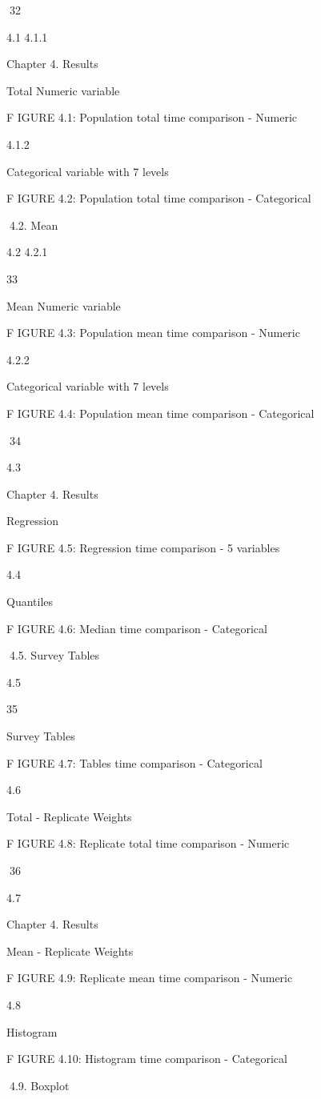 32

4.1
4.1.1

Chapter 4. Results

Total
Numeric variable

F IGURE 4.1: Population total time comparison - Numeric

4.1.2

Categorical variable with 7 levels

F IGURE 4.2: Population total time comparison - Categorical

4.2. Mean

4.2
4.2.1

33

Mean
Numeric variable

F IGURE 4.3: Population mean time comparison - Numeric

4.2.2

Categorical variable with 7 levels

F IGURE 4.4: Population mean time comparison - Categorical

34

4.3

Chapter 4. Results

Regression

F IGURE 4.5: Regression time comparison - 5 variables

4.4

Quantiles

F IGURE 4.6: Median time comparison - Categorical

4.5. Survey Tables

4.5

35

Survey Tables

F IGURE 4.7: Tables time comparison - Categorical

4.6

Total - Replicate Weights

F IGURE 4.8: Replicate total time comparison - Numeric

36

4.7

Chapter 4. Results

Mean - Replicate Weights

F IGURE 4.9: Replicate mean time comparison - Numeric

4.8

Histogram

F IGURE 4.10: Histogram time comparison - Categorical

4.9. Boxplot


